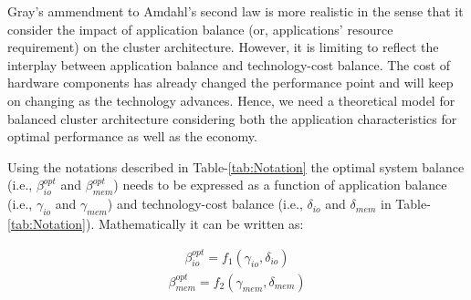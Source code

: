 \documentclass[journal]{IEEEtran}
\begin{document}
Gray's ammendment to Amdahl's second law is more realistic in the sense that it consider the impact of application balance (or, applications' resource requirement) on the cluster architecture.  However, it is limiting to reflect the interplay between application balance and technology-cost balance. The cost of hardware components has already changed the performance point and will keep on changing as the technology advances. Hence, we need a theoretical model for balanced cluster architecture considering both the application characteristics for optimal performance as well as the economy. 

Using the notations described in Table-\ref{tab:Notation} the optimal system balance (i.e., $\beta_{io}^{opt}$ and $\beta_{mem}^{opt}$) needs to be expressed as a function of application balance (i.e., $\gamma_{io}$ and $\gamma_{mem}$) and technology-cost balance (i.e., $\delta_{io}$ and $\delta_{mem}$ in Table-\ref{tab:Notation}). Mathematically it can be written as:

\begin{equation} \label{eqn:BalancedIONotation}
\begin{split}
\beta_{io}^{opt} = f_1(\gamma_{io}, \delta_{io})
\end{split}
\end{equation}
\begin{equation} \label{eqn:BalancedMemNotation}
\begin{split}
\beta_{mem}^{opt} = f_2(\gamma_{mem}, \delta_{mem})
\end{split}
\end{equation}
\end{document}
